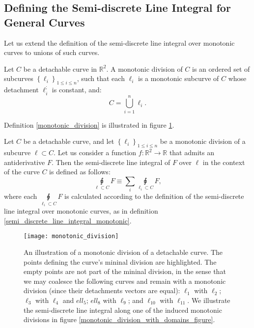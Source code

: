 \documentclass[11pt]{book}
\begin{document}
\subsection{Defining the Semi-discrete Line Integral for General Curves}
\label{semi_discrete_line_integral_general}
Let us extend the definition of the semi-discrete line integral over monotonic curves to unions of such curves.
\begin{definition}Let $C$ be a detachable curve in $\mathbb{R}^2$. A monotonic division of $C$ is an ordered set of subcurves $\left\{\ell_i\right\}_{1\leq i\leq n}$, such that each $\ell_i$ is a monotonic subcurve of $C$ whose detachment $\ell_i^;$ is constant, and:
\[C=\bigcup_{i=1}^{n}\ell_{i}.\]
\label{monotonic_division}
\end{definition}
Definition \ref{monotonic_division} is illustrated in figure \ref{monotonic_division_figure}.
\begin{definition}
Let $C$ be a detachable curve, and let $\left\{\ell_i\right\}_{1\leq i\leq n}$ be a monotonic division of a subcurve $\ell\subset C$.  Let us consider a function $f:\mathbb{R}^2\rightarrow\mathbb{R}$ that admits an antiderivative $F$. Then the semi-discrete line integral of $F$ over $\ell$ in the context of the curve $C$ is defined as follows:
$$\underset{\ell\subset C}{\sqint}F\equiv\underset{i}{\sum}\underset{\ell_{i}\subset C}{\sqint}F,$$
where each $\underset{\ell_{i}\subset C}{\sqint}F$ is calculated according to the definition of the semi-discrete line integral over monotonic curves, as in definition \ref{semi_discrete_line_integral_monotonic}.
\end{definition}

\begin{figure}
\texttt{[image: monotonic\_division]}
\caption{An illustration of a monotonic division of a detachable curve. The points defining the curve's mininal division are highlighted. The empty points are not part of the mininal division, in the sense that we may coalesce the following curves and remain with a monotonic division (since their detachments vectors are equal): $\ell_1$ with $\ell_2$; $\ell_3$ with $\ell_4$ and $ell_5$;  $ ell_8$ with $\ell_9$; and $\ell_{10}$ with $\ell_{11}$. We illustrate the semi-discrete line integral along one of the induced monotonic divisions in figure \ref{monotonic_division_with_domains_figure}.}\label{monotonic_division_figure}
\end{figure}
\end{document}
